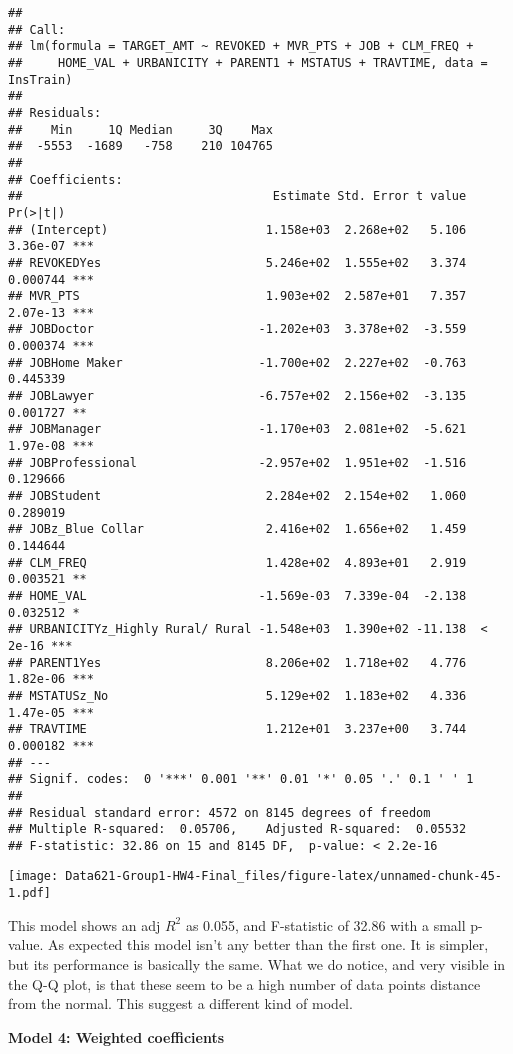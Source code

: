 \documentclass[]{article}
\begin{document}
\begin{verbatim}
## 
## Call:
## lm(formula = TARGET_AMT ~ REVOKED + MVR_PTS + JOB + CLM_FREQ + 
##     HOME_VAL + URBANICITY + PARENT1 + MSTATUS + TRAVTIME, data = InsTrain)
## 
## Residuals:
##    Min     1Q Median     3Q    Max 
##  -5553  -1689   -758    210 104765 
## 
## Coefficients:
##                                   Estimate Std. Error t value Pr(>|t|)    
## (Intercept)                      1.158e+03  2.268e+02   5.106 3.36e-07 ***
## REVOKEDYes                       5.246e+02  1.555e+02   3.374 0.000744 ***
## MVR_PTS                          1.903e+02  2.587e+01   7.357 2.07e-13 ***
## JOBDoctor                       -1.202e+03  3.378e+02  -3.559 0.000374 ***
## JOBHome Maker                   -1.700e+02  2.227e+02  -0.763 0.445339    
## JOBLawyer                       -6.757e+02  2.156e+02  -3.135 0.001727 ** 
## JOBManager                      -1.170e+03  2.081e+02  -5.621 1.97e-08 ***
## JOBProfessional                 -2.957e+02  1.951e+02  -1.516 0.129666    
## JOBStudent                       2.284e+02  2.154e+02   1.060 0.289019    
## JOBz_Blue Collar                 2.416e+02  1.656e+02   1.459 0.144644    
## CLM_FREQ                         1.428e+02  4.893e+01   2.919 0.003521 ** 
## HOME_VAL                        -1.569e-03  7.339e-04  -2.138 0.032512 *  
## URBANICITYz_Highly Rural/ Rural -1.548e+03  1.390e+02 -11.138  < 2e-16 ***
## PARENT1Yes                       8.206e+02  1.718e+02   4.776 1.82e-06 ***
## MSTATUSz_No                      5.129e+02  1.183e+02   4.336 1.47e-05 ***
## TRAVTIME                         1.212e+01  3.237e+00   3.744 0.000182 ***
## ---
## Signif. codes:  0 '***' 0.001 '**' 0.01 '*' 0.05 '.' 0.1 ' ' 1
## 
## Residual standard error: 4572 on 8145 degrees of freedom
## Multiple R-squared:  0.05706,    Adjusted R-squared:  0.05532 
## F-statistic: 32.86 on 15 and 8145 DF,  p-value: < 2.2e-16
\end{verbatim}

\texttt{[image: Data621-Group1-HW4-Final\_files/figure-latex/unnamed-chunk-45-1.pdf]}

This model shows an adj \(R^2\) as 0.055, and F-statistic of 32.86 with
a small p-value. As expected this model isn't any better than the first
one. It is simpler, but its performance is basically the same. What we
do notice, and very visible in the Q-Q plot, is that these seem to be a
high number of data points distance from the normal. This suggest a
different kind of model.

\textbf{Model 4: Weighted coefficients}
\end{document}
